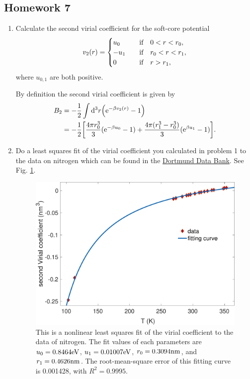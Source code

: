 \documentclass[10pt]{article}
\begin{document}
	\subsection{Homework 7}
	\begin{enumerate}
		\item Calculate the second virial coefficient for the soft-core potential
		\begin{equation}
			v_2(r) =
			\begin{cases}
				u_0 & \qif 0 < r < r_0, \\
				-u_1 & \qif r_0 < r < r_1, \\
				0 & \qif r > r_1,
			\end{cases}
		\end{equation}
		where $u_{0,1}$ are both positive.

		By definition the second virial coefficient is given by
		\begin{align}
			B_2 &= -\frac{1}{2} \int \dd^3 r \qty({\mathrm{e}}^{-\beta v_2(r)} - 1) \\
			&= -\frac{1}{2} \qty[\frac{4\pi r_0^3}{3}({\mathrm{e}}^{-\beta u_0} - 1) + \frac{4\pi (r_1^3 - r_0^3)}{3}({\mathrm{e}}^{\beta u_1} - 1)].
		\end{align}
		\item Do a least squares fit of the virial coefficient you calculated in problem 1 to the data on nitrogen which can be found in the \href{http://www.ddbst.com/en/EED/PCP/BII_C1056.php}{Dortmund Data Bank}. See Fig. \ref{fig: virial fit}.
		\begin{figure}[htbp]
			\centering
			\includegraphics[width=0.7 \textwidth]{figure/virial_fit.pdf}
			\caption{This is a nonlinear least squares fit of the virial coefficient to the data of nitrogen. The fit values of each parameters are $u_0 = 0.8464 {\mathrm{eV}}$, $u_1 = 0.01007 {\mathrm{eV}}$, $r_0 = 0.3094 {\mathrm{nm}}$, and $r_1 = 0.4626 {\mathrm{nm}}$. The root-mean-square error of this fitting curve is 0.001428, with $R^2 = 0.9995$.}
			\label{fig: virial fit}
		\end{figure}
	\end{enumerate}
\end{document}
